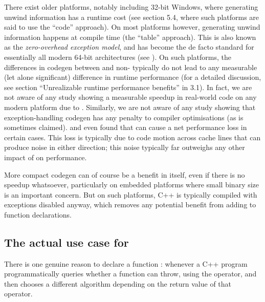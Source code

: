 There exist older platforms, notably including 32-bit Windows, where generating unwind information has a runtime cost (see \cite{TR18015} section 5.4, where such platforms are said to use the ``code'' approach). On most platforms however, generating unwind information happens at compile time (the ``table'' approach). This is also known as the \emph{zero-overhead exception model}, and has become the de facto standard for essentially all modern 64-bit architectures (see \cite{Mortoray2013}). On such platforms, the differences in codegen between  and non- typically do not lead to any measurable (let alone significant) difference in runtime performance (for a detailed discussion, see section ``Unrealizable runtime performance benefits'' in \cite{EMC++S} 3.1). In fact, we are not aware of any study showing a measurable speedup in real-world code on any modern platform due to . Similarly, we are not aware of any study showing that exception-handling codegen has any penalty to compiler optimisations (as is sometimes claimed). \cite{Mahaffey2017} and \cite{Dekker2019} even found that  can cause a net performance loss in certain cases. This loss is typically due to code motion across cache lines that can produce noise in either direction; this noise typically far outweighs any other impact of  on performance.

More compact codegen can of course be a benefit in itself, even if there is no speedup whatsoever, particularly on embedded platforms where small binary size is an important concern. But on such platforms, C++ is typically compiled with exceptions disabled anyway, which removes any potential benefit from adding  to function declarations.

\subsection{The actual use case for }

There is one genuine reason to declare a function : whenever a C++ program programmatically queries whether a function can throw, using the  operator, and then chooses a different algorithm depending on the return value of that operator.

